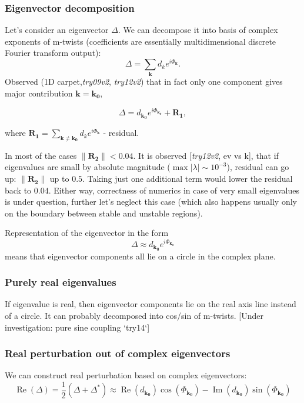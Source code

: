 \documentclass[a4paper,12pt]{article}
\renewcommand{\Re}{\operatorname{Re}}
\renewcommand{\Im}{\operatorname{Im}}
\newcommand{\D}{\Delta}%
\begin{document}
\subsubsection{ Eigenvector decomposition}
Let's consider an eigenvector $\D$. We can decompose it into basis of complex exponents of m-twists (coefficients are essentially multidimensional discrete Fourier transform output):
$$
\D = \sum_{\mathbf{k}} d_k e^{i \Phi_\mathbf{k}}.
$$
Observed (1D carpet,\textit{try09v2}, \textit{try12v2}) that in fact only one component gives major contribution $\mathbf{k}=\mathbf{k_0}$,

$$
\D = d_{\mathbf{k_0}} e^{i \Phi_\mathbf{k_0}}  + \mathbf{R_1},
$$

where $\mathbf{R_1} = \sum_{\mathbf{\mathbf{k} \neq \mathbf{k_0}}} d_k e^{i \Phi_\mathbf{k}}$ - residual.

In most of the cases $\lVert \mathbf{R_2} \rVert < 0.04$. It is observed [\textit{try12v2}, ev vs k], that if eigenvalues are small by absolute magnitude ($\max|\lambda| \sim  10^{-3}$), residual can go up: $\lVert \mathbf{R_2} \rVert$ up to $0.5$. Taking just one additional term would lower the residual back to $0.04$. Either way, correctness of numerics in case of very small eigenvalues is under question, further let's neglect this case (which also happens usually only on the boundary between stable and unstable regions).

Representation of the eigenvector in the form
$$
\D \approx d_{\mathbf{k_0}} e^{i \Phi_\mathbf{k_0}}
$$
means that eigenvector components all lie on a circle in the complex plane.

\subsubsection{Purely real eigenvalues}

If eigenvalue is real, then eigenvector components lie on the real axis line instead of a circle. It can probably decomposed into cos/sin of m-twists. [Under investigation: pure sine coupling `try14`]

\subsubsection{Real perturbation out of complex eigenvectors}

We can construct real perturbation based on complex eigenvectors:
$$
\Re(\D)
= \frac{1}{2} ( \D + \D^*) 
\approx  \Re(d_{\mathbf{k_0}}) \cos(\Phi_{\mathbf{k_0}}) - \Im(d_{\mathbf{k_0}}) \sin(\Phi_{\mathbf{k_0}})
$$
\end{document}
